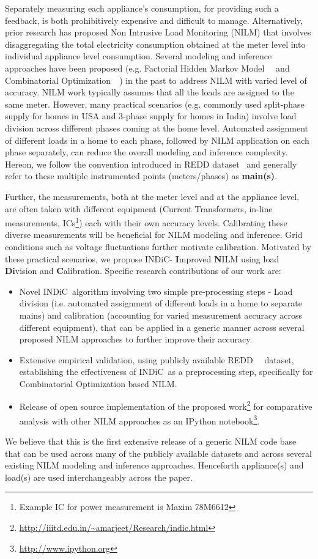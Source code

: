 \documentclass[conference]{IEEEtran}
\newcommand{\indic}{INDiC~}
\newcommand{\indicns}{INDiC}
\begin{document}
\noindent Separately measuring each appliance's consumption, for providing such a feedback, is both prohibitively expensive and difficult to manage. Alternatively, prior research has proposed Non Intrusive Load Monitoring (NILM) that involves disaggregating the total electricity consumption obtained at the meter level into individual appliance level consumption. Several modeling and inference approaches have been proposed (e.g. Factorial Hidden Markov Model~~\cite{Ghahramani_97a} and Combinatorial Optimization~~\cite{hart}) in the past to address NILM with varied level of accuracy. NILM work typically assumes that all the loads are assigned to the same meter. However, many practical scenarios (e.g. commonly used split-phase supply for homes in USA and 3-phase supply for homes in India) involve load division across different phases coming at the home level. Automated assignment of different loads in a home to each phase, followed by NILM application on each phase separately, can reduce the overall modeling and inference complexity. Hereon, we follow the convention introduced in REDD dataset~\cite{redd} and generally refer to these multiple instrumented points (meters/phases) as \textbf{main(s)}.

\noindent Further, the measurements, both at the meter level and at the appliance level, are often taken with different equipment (Current Transformers, in-line measurements, ICs\footnote{Example IC for power measurement is Maxim 78M6612}) each with their own accuracy levels. Calibrating these diverse measurements will be beneficial for NILM modeling and inference. Grid conditions such as voltage fluctuations further motivate calibration. Motivated by these practical scenarios, we propose \indicns - \textbf{I}mproved \textbf{N}ILM using load \textbf{Di}vision and \textbf{C}alibration. Specific research contributions of our work are:
\begin{itemize}
\item Novel \indic algorithm involving two simple pre-processing steps - Load division (i.e. automated assignment of different loads in a home to separate mains) and calibration (accounting for varied measurement accuracy across different equipment), that can be applied in a generic manner across several proposed NILM approaches to further improve their accuracy. 
\item Extensive empirical validation, using publicly available REDD~~\cite{redd} dataset, establishing the effectiveness of \indic as a preprocessing step, specifically for Combinatorial Optimization based NILM. 
\item Release of open source implementation of the proposed work\footnote{\url{http://iiitd.edu.in/~amarjeet/Research/indic.html}} for comparative analysis with other NILM approaches as an IPython notebook\footnote{\url{http://www.ipython.org}}. 
\end{itemize}
\noindent We believe that this is the first extensive release of a generic NILM code base that can be used across many of the publicly available datasets and across several existing NILM modeling and inference approaches. Henceforth appliance(s) and load(s) are used interchangeably across the paper.
\end{document}
